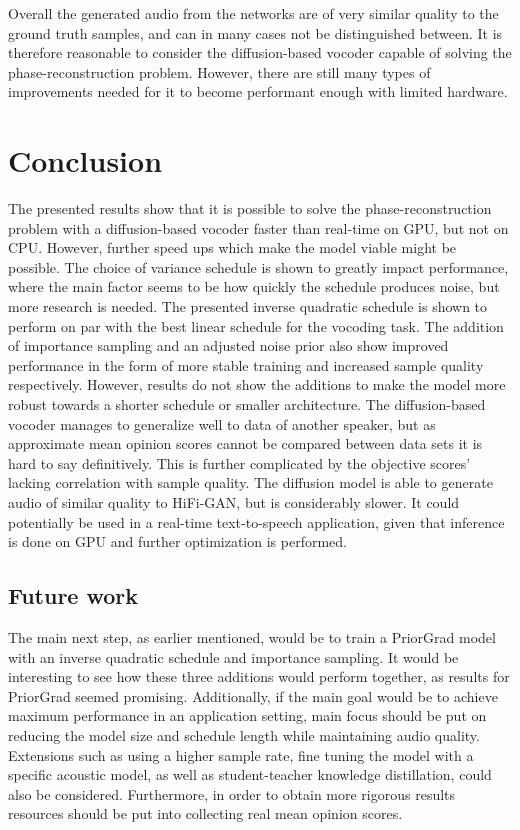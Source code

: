 \documentclass{report}
\begin{document}
Overall the generated audio from the networks are of very similar quality to the ground truth samples, and can in many cases not be distinguished between. It is therefore reasonable to consider the diffusion-based vocoder capable of solving the phase-reconstruction problem. However, there are still many types of improvements needed for it to become performant enough with limited hardware.

\newpage

\chapter{Conclusion}

The presented results show that it is possible to solve the phase-reconstruction problem with a diffusion-based vocoder faster than real-time on GPU, but not on CPU. However, further speed ups which make the model viable might be possible. The choice of variance schedule is shown to greatly impact performance, where the main factor seems to be how quickly the schedule produces noise, but more research is needed. The presented inverse quadratic schedule is shown to perform on par with the best linear schedule for the vocoding task. The addition of importance sampling and an adjusted noise prior also show improved performance in the form of more stable training and increased sample quality respectively. However, results do not show the additions to make the model more robust towards a shorter schedule or smaller architecture. The diffusion-based vocoder manages to generalize well to data of another speaker, but as approximate mean opinion scores cannot be compared between data sets it is hard to say definitively. This is further complicated by the objective scores' lacking correlation with sample quality. The diffusion model is able to generate audio of similar quality to HiFi-GAN, but is considerably slower. It could potentially be used in a real-time text-to-speech application, given that inference is done on GPU and further optimization is performed.

\section{Future work} \label{sec:futurework}

The main next step, as earlier mentioned, would be to train a PriorGrad model with an inverse quadratic schedule and importance sampling. It would be interesting to see how these three additions would perform together, as results for PriorGrad seemed promising. Additionally, if the main goal would be to achieve maximum performance in an application setting, main focus should be put on reducing the model size and schedule length while maintaining audio quality. Extensions such as using a higher sample rate, fine tuning the model with a specific acoustic model, as well as student-teacher knowledge distillation, could also be considered. Furthermore, in order to obtain more rigorous results resources should be put into collecting real mean opinion scores.
\end{document}
